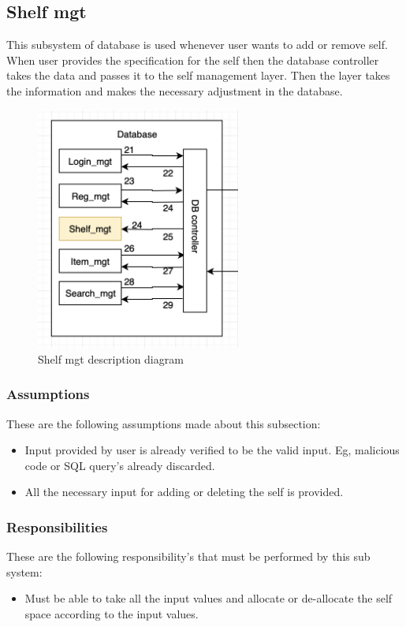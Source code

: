 \subsection{Shelf mgt}
This subsystem of database is used whenever user wants to add or remove self. When user provides the specification for the self then the database controller takes the data and passes it to the self management layer. Then the layer takes the information and makes the necessary adjustment in the database.
\begin{figure}[h!]
	\centering
 	\includegraphics[width=0.60\textwidth]{images/shelfmgt}
 \caption{Shelf mgt description diagram}
\end{figure}

\subsubsection{Assumptions}
These are the following assumptions made about this subsection:
\begin{itemize}
    \item Input provided by user is already verified to be the valid input. Eg, malicious code or SQL query's already discarded.
    \item All the necessary input for adding or deleting the self is provided.
\end{itemize}

\subsubsection{Responsibilities}
These are the following responsibility's that must be performed by this sub system:
\begin{itemize}
    \item Must be able to take all the input values and allocate or de-allocate the self space according to the input values.
\end{itemize}

